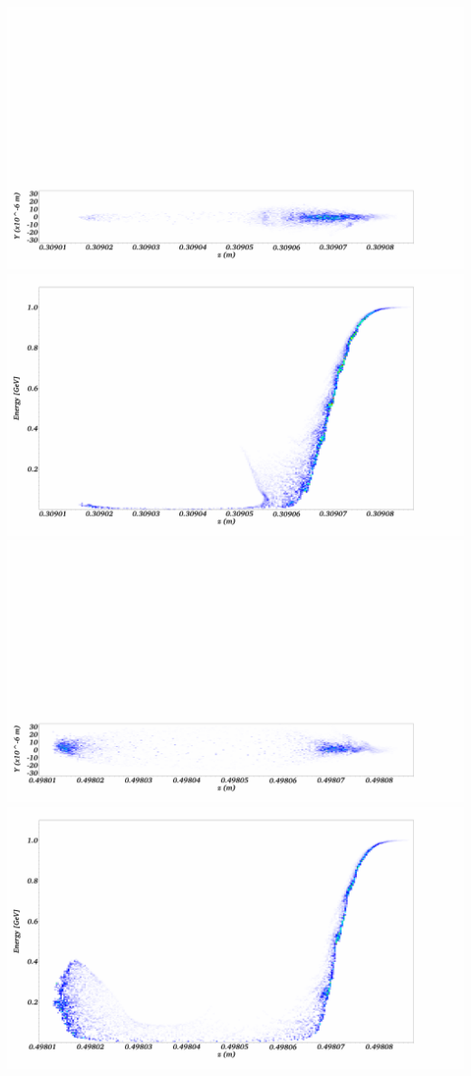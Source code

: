 \clearpage
\includegraphics[width=\textwidth]{visit0021}\vspace{-1pt}\\
\includegraphics[width=\textwidth]{visit0019}
\clearpage
\includegraphics[width=\textwidth]{visit0022}\vspace{-1pt}\\
\includegraphics[width=\textwidth]{visit0020}
